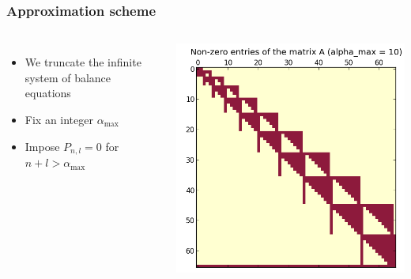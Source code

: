 \documentclass[table,aspectratio=169]{beamer}
\begin{document}
\begin{frame}[t]\frametitle{Approximation scheme}
    \begin{columns}
        \begin{itemize}
            \item We truncate the infinite system of balance equations
            \item Fix an integer $\alpha_{\text{max}}$
            \item Impose $P_{n,l} = 0$ for $n + l > \alpha_{\text{max}}$
        \end{itemize}
        \centering
        \includegraphics[width=.75\textwidth]{spyAbar}
    \end{columns}
\end{frame}
\end{document}
